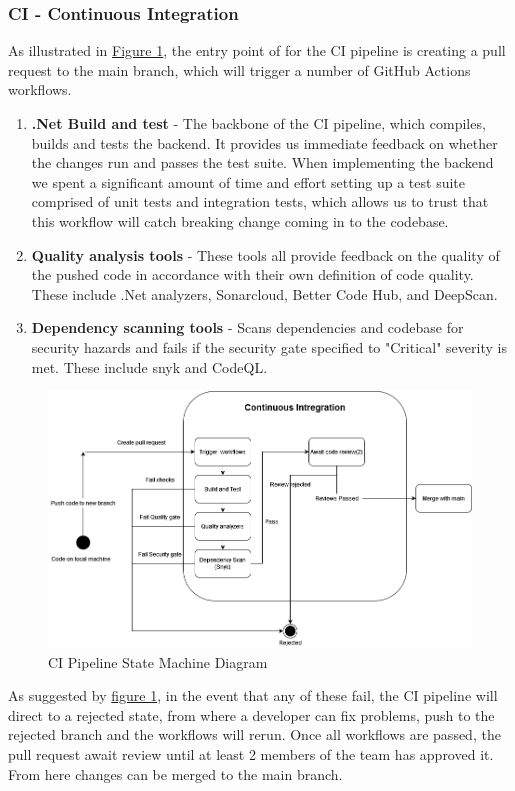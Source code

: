 \subsubsection{CI - Continuous Integration}
\label{subsubsec:ci}
As illustrated in \hyperref[fig:CIStateMachine]{Figure 1}, the entry point of for the CI pipeline is creating a pull request to the main branch, which will trigger a number of GitHub Actions workflows.
\begin{enumerate}
    \item \textbf{.Net Build and test} - The backbone of the CI pipeline, which compiles, builds and tests the backend. It provides us immediate feedback on whether the changes run and passes the test suite. When implementing the backend we spent a significant amount of time and effort setting up a test suite comprised of unit tests and integration tests, which allows us to trust that this workflow will catch breaking change coming in to the codebase.
    \item \textbf{Quality analysis tools} - These tools all provide feedback on the quality of the pushed code in accordance with their own definition of code quality. These include .Net analyzers, Sonarcloud, Better Code Hub, and DeepScan.
    \item \textbf{Dependency scanning tools} - Scans dependencies and codebase for security hazards and fails if the security gate specified to "Critical" severity is met. These include snyk and CodeQL.
\end{enumerate}


\begin {figure}[H]
    \centering
    \includegraphics[scale=0.50]{images/DevopsDiagrams-StateMachine CI.drawio(4).png}
    \caption{CI Pipeline State Machine Diagram}
    \label{fig:CIStateMachine}
\end{figure}
As suggested by \hyperref[fig:CIStateMachine]{figure 1}, in the event that any of these fail, the CI pipeline will direct to a rejected state, from where a developer can fix problems, push to the rejected branch and the workflows will rerun. Once all workflows are passed, the pull request await review until at least 2 members of the team has approved it. From here changes can be merged to the main branch.

